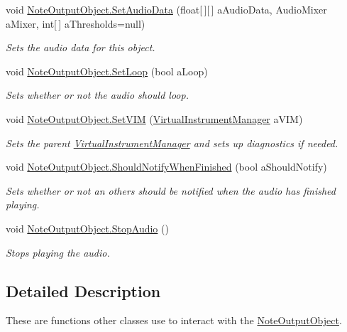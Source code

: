 \begin{DoxyCompactItemize}
void \hyperlink{group___n_o_o_pub_func_gaef9ab691f0a2671a62249d853f24162d}{Note\+Output\+Object.\+Set\+Audio\+Data} (float\mbox{[}$\,$\mbox{]}\mbox{[}$\,$\mbox{]} a\+Audio\+Data, Audio\+Mixer a\+Mixer, int\mbox{[}$\,$\mbox{]} a\+Thresholds=null)
\begin{DoxyCompactList}\small\item\em Sets the audio data for this object. \end{DoxyCompactList}\item 
void \hyperlink{group___n_o_o_pub_func_ga7b79bbd2c7a68831b322edff140f29d2}{Note\+Output\+Object.\+Set\+Loop} (bool a\+Loop)
\begin{DoxyCompactList}\small\item\em Sets whether or not the audio should loop. \end{DoxyCompactList}\item 
void \hyperlink{group___n_o_o_pub_func_gaca261a6f8d95fc7f81bbc3c8108bad58}{Note\+Output\+Object.\+Set\+V\+IM} (\hyperlink{class_virtual_instrument_manager}{Virtual\+Instrument\+Manager} a\+V\+IM)
\begin{DoxyCompactList}\small\item\em Sets the parent \hyperlink{class_virtual_instrument_manager}{Virtual\+Instrument\+Manager} and sets up diagnostics if needed. \end{DoxyCompactList}\item 
void \hyperlink{group___n_o_o_pub_func_gab7bad1b7d462676843be9e0bbfa1c9fb}{Note\+Output\+Object.\+Should\+Notify\+When\+Finished} (bool a\+Should\+Notify)
\begin{DoxyCompactList}\small\item\em Sets whether or not an others should be notified when the audio has finished playing. \end{DoxyCompactList}\item 
void \hyperlink{group___n_o_o_pub_func_gae8a8e5bc027fd0186464a68399a4fecb}{Note\+Output\+Object.\+Stop\+Audio} ()
\begin{DoxyCompactList}\small\item\em Stops playing the audio. \end{DoxyCompactList}\end{DoxyCompactItemize}


\subsection{Detailed Description}
These are functions other classes use to interact with the \hyperlink{class_note_output_object}{Note\+Output\+Object}. 

